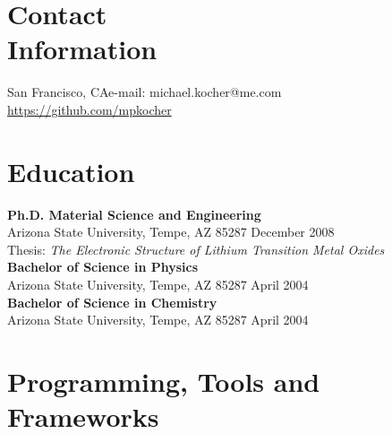 \documentclass[margin,line]{resume}
\begin{document}
\begin{resume}

    \section{\mysidestyle Contact\\Information}

    San Francisco, CA\hfill e-mail: michael.kocher@me.com\\\vspace{4.0mm}
    \hfill{\url{https://github.com/mpkocher}}%


    
    \section{\mysidestyle Education}

    \textbf{Ph.D. Material Science and Engineering} \\
    Arizona State University,  Tempe, AZ 85287 \hfill December 2008\\
    Thesis: \textsl{The Electronic Structure of Lithium Transition Metal Oxides}\vspace{2mm}\\
    \textbf{Bachelor of Science in Physics} \\
    Arizona State University,  Tempe, AZ 85287 \hfill April 2004\vspace{2mm}\\
    \textbf{Bachelor of Science in Chemistry}\\
    Arizona State University,  Tempe, AZ 85287 \hfill April 2004\\\vspace{-3mm}




    \section{\mysidestyle Programming, Tools and Frameworks}


\end{resume}
\end{document}
